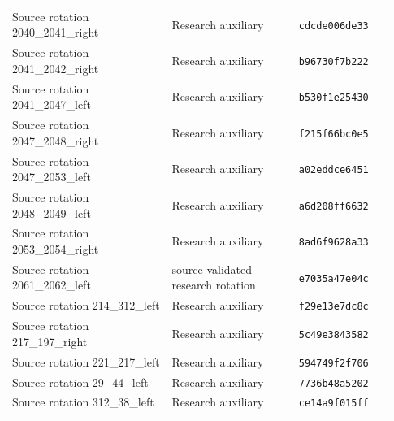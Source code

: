 \begin{longtable}{@{}p{0.39\linewidth}p{0.31\linewidth}p{0.23\linewidth}@{}}
Source rotation 2040\_\allowbreak{}2041\_\allowbreak{}right & Research auxiliary & \texttt{cdcde006de33}\\[3pt]
Source rotation 2041\_\allowbreak{}2042\_\allowbreak{}right & Research auxiliary & \texttt{b96730f7b222}\\[3pt]
Source rotation 2041\_\allowbreak{}2047\_\allowbreak{}left & Research auxiliary & \texttt{b530f1e25430}\\[3pt]
Source rotation 2047\_\allowbreak{}2048\_\allowbreak{}right & Research auxiliary & \texttt{f215f66bc0e5}\\[3pt]
Source rotation 2047\_\allowbreak{}2053\_\allowbreak{}left & Research auxiliary & \texttt{a02eddce6451}\\[3pt]
Source rotation 2048\_\allowbreak{}2049\_\allowbreak{}left & Research auxiliary & \texttt{a6d208ff6632}\\[3pt]
Source rotation 2053\_\allowbreak{}2054\_\allowbreak{}right & Research auxiliary & \texttt{8ad6f9628a33}\\[3pt]
Source rotation 2061\_\allowbreak{}2062\_\allowbreak{}left & source-validated research rotation & \texttt{e7035a47e04c}\\[3pt]
Source rotation 214\_\allowbreak{}312\_\allowbreak{}left & Research auxiliary & \texttt{f29e13e7dc8c}\\[3pt]
Source rotation 217\_\allowbreak{}197\_\allowbreak{}right & Research auxiliary & \texttt{5c49e3843582}\\[3pt]
Source rotation 221\_\allowbreak{}217\_\allowbreak{}left & Research auxiliary & \texttt{594749f2f706}\\[3pt]
Source rotation 29\_\allowbreak{}44\_\allowbreak{}left & Research auxiliary & \texttt{7736b48a5202}\\[3pt]
Source rotation 312\_\allowbreak{}38\_\allowbreak{}left & Research auxiliary & \texttt{ce14a9f015ff}\\[3pt]
\bottomrule\end{longtable}
\endgroup
